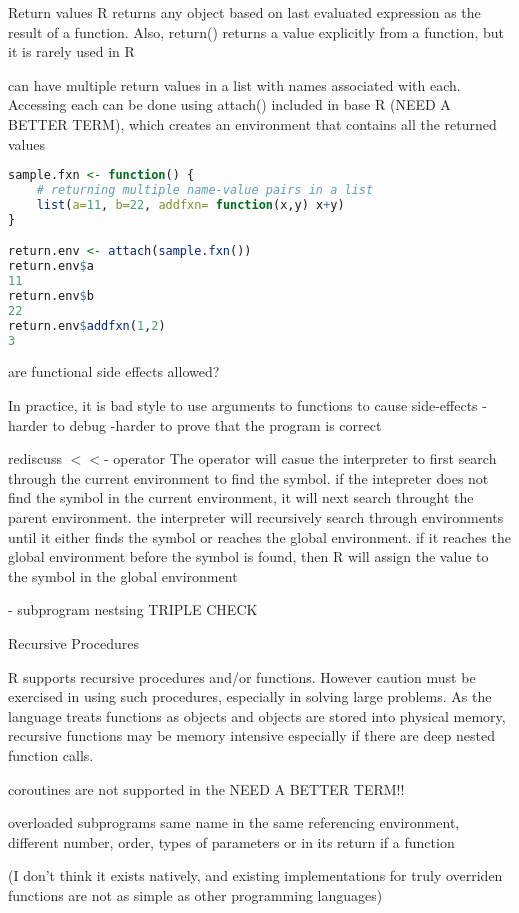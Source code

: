 \documentclass[12pt]{article}
\begin{document}
Return values
R returns any object based on last evaluated expression  as the result of a function. Also, return() returns a value explicitly from a function, but it is rarely used in R

can have multiple return values in a list with names associated with each. Accessing each can be done using attach() included in base R (NEED A BETTER TERM), which creates an environment that contains all the returned values

\begin{lstlisting}[language=R]
sample.fxn <- function() {
	# returning multiple name-value pairs in a list
	list(a=11, b=22, addfxn= function(x,y) x+y)
}

return.env <- attach(sample.fxn())
return.env$a
11
return.env$b
22
return.env$addfxn(1,2)
3
\end{lstlisting}

are functional side effects allowed?

In practice, it is bad style to use arguments to functions to cause side-effects
-harder to debug
-harder to prove that the program is correct

rediscuss \(<<\)- operator
The operator will casue the interpreter to first search through the current environment to find the symbol. if the intepreter does not find the symbol in the current environment, it will next search throught the parent environment. the interpreter will recursively search through environments until it either finds the symbol or reaches the global environment. if it reaches the global environment before the symbol is found, then R will assign the value to the symbol in the global environment

- subprogram nestsing TRIPLE CHECK

Recursive Procedures

R supports recursive procedures and/or functions. However caution must be exercised in using such procedures, especially in solving large problems. As the language treats functions as objects and objects are stored into physical memory, recursive functions may be memory intensive especially if there are deep nested function calls.

coroutines
are not supported in the NEED A BETTER TERM!!



overloaded subprograms
same name in the same referencing environment, different number, order, types of parameters or in its return if a function

(I don’t think it exists natively, and existing implementations for truly overriden functions are not as simple as other programming languages)
\end{document}
